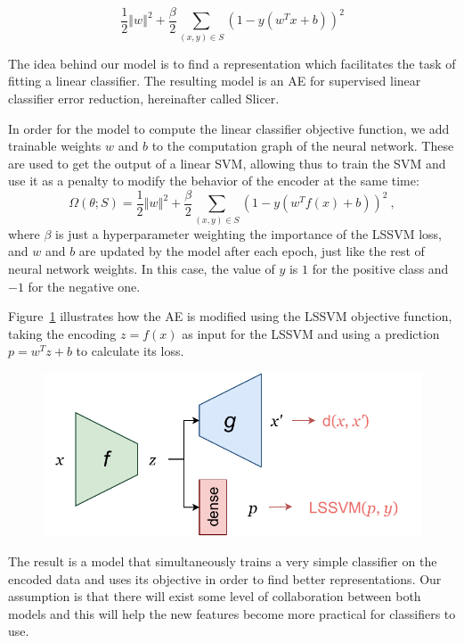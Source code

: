 \begin{equation}\frac 1 2 \left\Vert w\right\Vert^2+\frac \beta 2\sum_{(x,y)\in S}\left(1 - y\left(w^Tx+b\right)\right)^2\end{equation}

The idea behind our model is to find a representation which facilitates the task of fitting a linear classifier. The resulting model is an AE for supervised linear classifier error reduction, hereinafter called Slicer.

In order for the model to compute the linear classifier objective function, we add trainable weights $w$ and $b$ to the computation graph of the neural network. These are used to get the output of a linear SVM, allowing thus to train the SVM and use it as a penalty to modify the behavior of the encoder at the same time:
\begin{equation}\Omega(\theta;S)=\frac 1 2 \left\Vert w\right\Vert^2+\frac \beta 2\sum_{(x,y)\in S}\left(1 - y\left(w^Tf(x)+b\right)\right)^2~,\end{equation}
where $\beta$ is just a hyperparameter weighting the importance of the LSSVM loss, and $w$ and $b$ are updated by the model after each epoch, just like the rest of neural network weights. In this case, the value of $y$ is $1$ for the positive class and $-1$ for the negative one.


Figure~\ref{p6fig.slicer} illustrates how the AE is modified using the LSSVM objective function, taking the encoding $z=f(x)$ as input for the LSSVM and using a prediction $p=w^Tz+b$ to calculate its loss.

\begin{figure}[ht]
  \centering
  \includegraphics[width=.4\textwidth]{slicer.pdf}
  \caption{\label{p6fig.slicer}}
\end{figure}

The result is a model that simultaneously trains a very simple classifier on the encoded data and uses its objective in order to find better representations. Our assumption is that there will exist some level of collaboration between both models and this will help the new features become more practical for classifiers to use.

